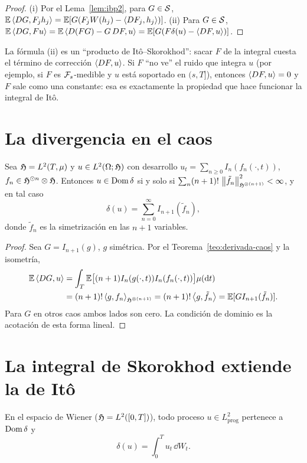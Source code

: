\begin{proof}
(i) Por el Lema~\ref{lem:ibp2}, para $G\in\mathcal{S}$, $\mathbb{E}\left\langle DG, F_jh_j\right\rangle=\mathbb{E}[G(F_jW(h_j)-\left\langle DF_j, h_j\right\rangle)]$.
(ii) Para $G\in\mathcal{S}$, $\mathbb{E}\left\langle DG, Fu\right\rangle=\mathbb{E}\left\langle D(FG)-G\,DF, u\right\rangle=\mathbb{E}[G(F\delta(u)-\left\langle DF, u\right\rangle)]$.
\end{proof}

\begin{intuicion}
La fórmula (ii) es un ``producto de Itô--Skorokhod'': sacar $F$ de la integral cuesta el
término de corrección $\left\langle DF, u\right\rangle$. Si $F$ ``no ve'' el ruido que integra $u$ (por ejemplo, si $F$
es $\mathcal{F}_s$-medible y $u$ está soportado en $(s,T]$), entonces $\left\langle DF, u\right\rangle=0$ y $F$ sale como una
constante: esa es exactamente la propiedad que hace funcionar la integral de Itô.
\end{intuicion}

\section{La divergencia en el caos}

\begin{proposicion}\label{prop:delta-caos}
Sea $\mathfrak{H}=L^2(T,\mu)$ y $u\in L^2(\Omega;\mathfrak{H})$ con desarrollo $u_t=\sum_{n\ge0}I_n(f_n(\cdot,t))$,
$f_n\in\mathfrak{H}^{\odot n}\otimes\mathfrak{H}$. Entonces $u\in\operatorname{Dom}\delta$ si y solo si $\sum_n(n+1)!\,\left\lVert \tilde f_n\right\rVert^2_{\mathfrak{H}^{\otimes(n+1)}}<\infty$, y en tal caso
\[
  \delta(u)=\sum_{n=0}^\infty I_{n+1}(\tilde f_n),
\]
donde $\tilde f_n$ es la simetrización en las $n+1$ variables.
\end{proposicion}

\begin{proof}
Sea $G=I_{n+1}(g)$, $g$ simétrica. Por el Teorema~\ref{teo:derivada-caos} y la isometría,
\begin{align*}
  \mathbb{E}\left\langle DG, u\right\rangle&=\int_T\mathbb{E}\big[(n+1)I_n(g(\cdot,t))I_n(f_n(\cdot,t))\big]\mu(\mathrm{d} t)\\
  &=(n+1)!\left\langle g, f_n\right\rangle_{\mathfrak{H}^{\otimes(n+1)}}=(n+1)!\left\langle g, \tilde f_n\right\rangle=\mathbb{E}[GI_{n+1}(\tilde f_n)].
\end{align*}
Para $G$ en otros caos ambos lados son cero. La condición de dominio es la acotación de esta
forma lineal.
\end{proof}

\section{La integral de Skorokhod extiende la de Itô}

\begin{teorema}\label{teo:skorokhod-ito}
En el espacio de Wiener ($\mathfrak{H}=L^2([0,T])$), todo proceso $u\in L^2_{\mathrm{prog}}$ pertenece
a $\operatorname{Dom}\delta$ y
\[
  \delta(u)=\int_0^Tu_t\,\dd W_t.
\]
\end{teorema}

